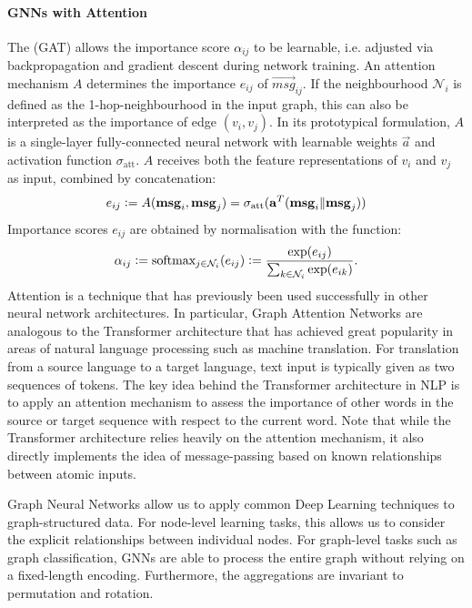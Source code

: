 \documentclass[
	fontsize=10pt, %
	twoside=true, %
	secnumdepth=1, %
  toc=indentunnumbered %
]{kaobook}
\begin{document}
\paragraph{GNNs with Attention} The  (GAT)
\cite{velickovic_graph_2018} allows the importance score $\alpha_{ij}$ to be learnable, i.e.
adjusted via backpropagation and gradient descent during network training. An
attention mechanism $A$ determines the importance $e_{ij}$ of $\vec{msg}_{ij}$.
If the neighbourhood $\mathcal{N}_i$ is defined as the 1-hop-neighbourhood in
the input graph, this can also be interpreted as the importance of edge $(v_i,
v_j)$. In its prototypical formulation, $A$ is a single-layer fully-connected
neural network with learnable weights $\vec a$ and activation function
$\sigma_{\text{att}}$. $A$ receives
both the feature representations of $v_i$ and $v_j$ as input, combined by
concatenation:
\begin{align}
  e_{ij} := A(\mathbf{msg}_i, \mathbf{msg}_j) = \sigma_{\text{att}}(\mathbf{a}^T( \mathbf{msg}_i \| \mathbf{msg}_j))
  \label{eq:graph-attention}
\end{align}
Importance scores $e_{ij}$ are obtained by normalisation with the  function:
\begin{align}
  \alpha_{ij} := \text{softmax}_{j \in \mathcal{N}_i}(e_{ij}) := \frac{\exp(e_{ij})}{\sum_{k \in \mathcal{N}_i} \exp(e_{ik})}.
  \label{eq:softmax}
\end{align}
Attention is a technique that has previously been used successfully in other
neural network architectures. In particular, Graph Attention Networks are
analogous to the Transformer architecture \cite{vaswani_AttentionAllYou_2017}
that has achieved great popularity in areas of natural language processing such as machine translation.
For translation from a source language
to a target language, text input is typically given as two sequences of tokens.
The key idea behind the Transformer architecture in NLP is to apply an attention
mechanism to assess the importance of other words in the source or target
sequence with respect to the current word.
Note that while the Transformer architecture relies heavily on the attention
mechanism, it also directly implements the idea of message-passing based on
known relationships between atomic inputs.

Graph Neural Networks allow us to apply common Deep Learning techniques to
graph-structured data. For node-level learning tasks, this allows us to consider
the explicit relationships between individual nodes. For graph-level tasks such
as graph classification, GNNs are able to process the entire graph without
relying on a fixed-length encoding. Furthermore, the aggregations are invariant
to permutation and rotation.
\end{document}
